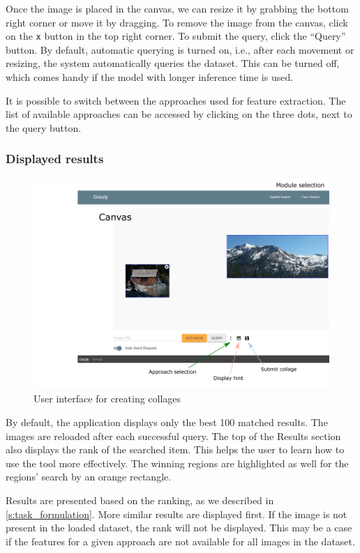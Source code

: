 Once the image is placed in the canvas, we can resize it by grabbing the bottom right corner or move it by dragging. To remove the image from the canvas, click on the \verb+x+ button in the top right corner. To submit the query, click the ``Query'' button. By default, automatic querying is turned on, i.e., after each movement or resizing, the system automatically queries the dataset. This can be turned off, which comes handy if the model with longer inference time is used.

It is possible to switch between the approaches used for feature extraction. The list of available approaches can be accessed by clicking on the three dots, next to the query button.

\subsubsection*{Displayed results}

\begin{figure}
    \includegraphics[width=0.9\linewidth]{img/spatial_ui.png}
    \caption{User interface for creating collages}
    \label{fig:ui_collage}
\end{figure}

By default, the application displays only the best 100 matched results. The images are reloaded after each successful query. The top of the Results section also displays the rank of the searched item. This helps the user to learn how to use the tool more effectively. The winning regions are highlighted as well for the regions' search by an orange rectangle.

Results are presented based on the ranking, as we described in \autoref{s:task_formulation}. More similar results are displayed first. If the image is not present in the loaded dataset, the rank will not be displayed. This may be a case if the features for a given approach are not available for all images in the dataset.

